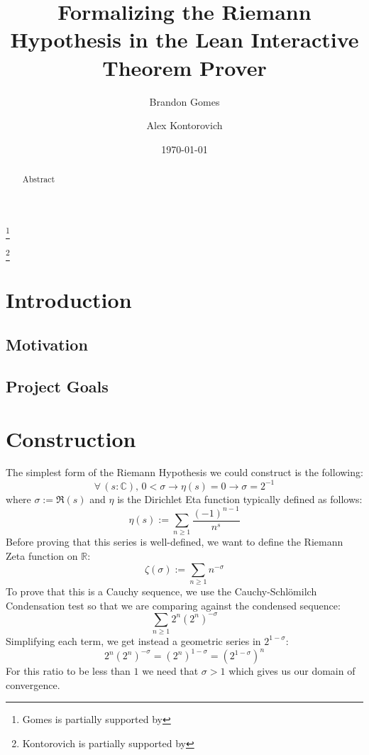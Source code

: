 \documentclass[12pt,reqno]{amsart}
\numberwithin{equation}{section}
\begin{document}
\author{Brandon Gomes}
\thanks{Gomes is partially supported by}
\address{Rutgers University, New Brunswick, NJ}

\author{Alex Kontorovich}
\thanks{Kontorovich is partially supported by}
\address{Rutgers University, New Brunswick, NJ}

\title[Formalizing the Riemann Hypothesis]{Formalizing the Riemann Hypothesis in the Lean Interactive Theorem Prover}

\begin{abstract}
Abstract
\end{abstract}

\date{\today}
\maketitle
\tableofcontents

\section{Introduction}

\subsection{Motivation}


\subsection{Project Goals}


\section{Construction}

The simplest form of the Riemann Hypothesis we could construct is the following:
\[
    \forall\,(s : \mathbb{C}),\, 0 < \sigma \to \eta (s) = 0 \to \sigma = 2^{-1}
\]
where $\sigma := \Re(s)$ and $\eta$ is the Dirichlet Eta function typically defined as follows:
\[
    \eta(s) := \sum_{n\geq 1}\frac{(-1)^{n-1}}{n^s}
\]
Before proving that this series is well-defined, we want to define the Riemann Zeta function on $\mathbb{R}$:
\[
    \zeta(\sigma) := \sum_{n\geq 1}n^{-\sigma}
\]
To prove that this is a Cauchy sequence, we use the Cauchy-Schl\"omilch Condensation test so that we are comparing against the condensed sequence:
\[
    \sum_{n\geq 1}2^n(2^n)^{-\sigma}
\]
Simplifying each term, we get instead a geometric series in $2^{1-\sigma}$:
\[
    2^n(2^n)^{-\sigma} = (2 ^ n)^{1 - \sigma} = (2 ^ {1 - \sigma}) ^ n
\]
For this ratio to be less than $1$ we need that $\sigma > 1$ which gives us our domain of convergence.
\end{document}
